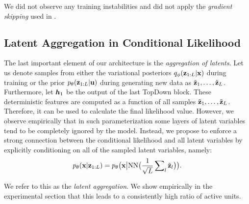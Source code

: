 We did not observe any training instabilities and did not apply the \textit{gradient skipping} used in \cite{Child2020-ze}.

 \subsection{Latent Aggregation in Conditional Likelihood} \label{subsec:latent_aggr}

The last important element of our architecture is the \textit{aggregation of latents}. Let us denote samples from either the variational posteriors $q_{\phi}({\mathbf{z}}_{1:L}|{\mathbf{x}})$ during training or the prior $p_{\theta}({\mathbf{z}}_{1:L}|{\mathbf{u}})$ during generating new data as $\tilde{{\mathbf{z}}}_1, \dots, \tilde{{\mathbf{z}}}_L$.  
Furthermore, let ${\bm{h}}_1$ be the output of the last TopDown block. 
These deterministic features are computed as a function of all samples $\tilde{{\mathbf{z}}}_1, \dots, \tilde{{\mathbf{z}}}_L$.
Therefore, it can be used to calculate the final likelihood value.
However, we observe empirically that in such parameterization some layers of latent variables tend to be completely ignored by the model.
Instead, we propose to enforce a strong connection between the conditional likelihood and all latent variables by explicitly conditioning on all of the sampled latent variables, namely: 
\begin{align} \label{eq:cond_like_ours}
    p_{\theta}(\rvx | \rvz_{1:L}) = p_{\theta}\big( \rvx \big| \text{NN}\big(\frac{1}{\sqrt{L}}\sum\nolimits_l \tilde{\rvz}_l\big) \big).
\end{align}

We refer to this as the \textit{latent aggregation}.
We show empirically in the experimental section that this leads to a consistently high ratio of active units. 




